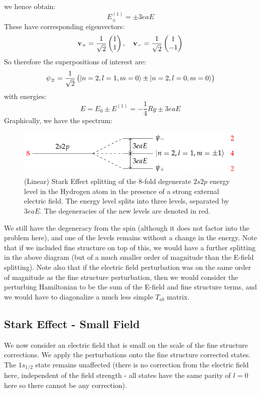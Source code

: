 we hence obtain:
\begin{equation}
    E^{(1)}_\pm = \pm 3eaE
\end{equation}
These have corresponding eigenvectors:
\begin{equation}
    \mathbf{v}_+ = \frac{1}{\sqrt{2}}\begin{pmatrix}1\\1\end{pmatrix}, \quad \mathbf{v}_- = \frac{1}{\sqrt{2}}\begin{pmatrix}1\\-1\end{pmatrix}
\end{equation}
So therefore the superpositions of interest are:
\begin{equation}
    \psi_\pm = \frac{1}{\sqrt{2}}\left(\lvert n=2, l=1, m=0 \rangle \pm \lvert n=2, l=0, m=0 \rangle\right)
\end{equation}
with energies:
\begin{equation}
    E = E_0 \pm E^{(1)} =  -\frac{1}{4}\si{Ry} \pm 3eaE 
\end{equation}
Graphically, we have the spectrum:
\begin{figure}[htbp]
    \centering
    \includegraphics[]{Images/fig-strongstarkeffectsplit.pdf}
    
    \caption{(Linear) Stark Effect splitting of the 8-fold degenerate $2s2p$ energy level in the Hydrogen atom in the presence of a strong external electric field. The energy level splits into three levels, separated by $3eaE$. The degeneracies of the new levels are denoted in red.}
    \label{fig-strongstarkeffectsplit}
\end{figure}

We still have the degeneracy from the spin (although it does not factor into the problem here), and one of the levels remains without a change in the energy. Note that if we included fine structure on top of this, we would have a further splitting in the above diagram (but of a much smaller order of magnitude than the E-field splitting). Note also that if the electric field perturbation was on the same order of magnitude as the fine structure perturbation, then we would consider the perturbing Hamiltonian to be the sum of the E-field and fine structure terms, and we would have to diagonalize a much less simple $T_{ab}$ matrix.

\subsection{Stark Effect - Small Field}
We now consider an electric field that is small on the scale of the fine structure corrections. We apply the perturbations onto the fine structure corrected states. The $1s_{1/2}$ state remains unaffected (there is no correction from the electric field here, independent of the field strength - all states have the same parity of $l = 0$ here so there cannot be any correction).

